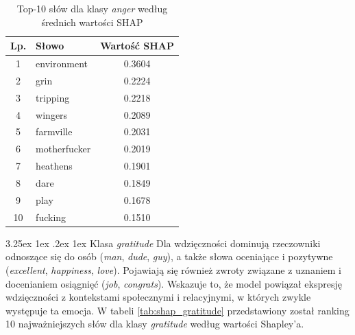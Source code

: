 \documentclass[wmii, inf, mgr]{uwmthesis}
\makeatletter
\renewcommand\paragraph{\@startsection{paragraph}{4}{\z@}%
  {3.25ex \@plus1ex \@minus.2ex}%
  {1ex}%
  {\normalfont\normalsize\bfseries}}
\makeatother
\begin{document}
\begin{table}[H]
	\centering
	\renewcommand{\arraystretch}{1.3}
	\begin{tabular}{|c|l|c|}
		\hline
		\textbf{Lp.} & \textbf{Słowo} & \textbf{Wartość SHAP} \\ \hline
		1 & environment   & 0.3604 \\ \hline
		2 & grin          & 0.2224 \\ \hline
		3 & tripping      & 0.2218 \\ \hline
		4 & wingers       & 0.2089 \\ \hline
		5 & farmville     & 0.2031 \\ \hline
		6 & motherfucker  & 0.2019 \\ \hline
		7 & heathens      & 0.1901 \\ \hline
		8 & dare          & 0.1849 \\ \hline
		9 & play          & 0.1678 \\ \hline
		10 & fucking      & 0.1510 \\ \hline
	\end{tabular}
	\caption{Top-10 słów dla klasy \textit{anger} według średnich wartości SHAP}
	\label{tab:shap_anger}
\end{table}


\paragraph{Klasa \textit{gratitude}}
Dla wdzięczności dominują rzeczowniki odnoszące się do osób (\textit{man}, \textit{dude}, \textit{guy}), a także słowa oceniające i pozytywne (\textit{excellent}, \textit{happiness}, \textit{love}). Pojawiają się również zwroty związane z uznaniem i docenianiem osiągnięć (\textit{job}, \textit{congrats}). Wskazuje to, że model powiązał ekspresję wdzięczności z kontekstami społecznymi i relacyjnymi, w których zwykle występuje ta emocja. W tabeli \ref{tab:shap_gratitude} przedstawiony został ranking 10 najważniejszych słów dla klasy \textit{gratitude} według wartości Shapley’a.
\end{document}
